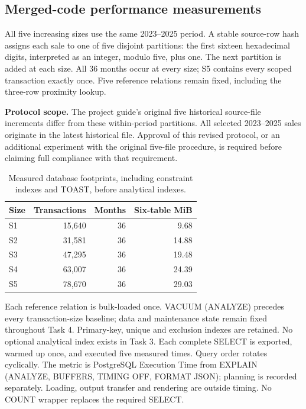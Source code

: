 \documentclass[11pt,a4paper]{article}
\begin{document}
\subsection{Merged-code performance measurements}
All five increasing sizes use the same 2023--2025 period. A stable source-row hash assigns each sale to one of five disjoint partitions: the first sixteen hexadecimal digits, interpreted as an integer, modulo five, plus one. The next partition is added at each size. All 36 months occur at every size; S5 contains every scoped transaction exactly once. Five reference relations remain fixed, including the three-row proximity lookup.

\textbf{Protocol scope.} The project guide's original five historical source-file increments differ from these within-period partitions. All selected 2023--2025 sales originate in the latest historical file. Approval of this revised protocol, or an additional experiment with the original five-file procedure, is required before claiming full compliance with that requirement.

\begin{table}[H]\centering\small
\begin{tabular}{lrrr}
\toprule
Size & Transactions & Months & Six-table MiB \\
\midrule
S1 & 15,640 & 36 & 9.68 \\
S2 & 31,581 & 36 & 14.88 \\
S3 & 47,295 & 36 & 19.48 \\
S4 & 63,007 & 36 & 24.39 \\
S5 & 78,670 & 36 & 29.03 \\
\bottomrule
\end{tabular}
\caption{Measured database footprints, including constraint indexes and TOAST, before analytical indexes.}
\end{table}

Each reference relation is bulk-loaded once. VACUUM (ANALYZE) precedes every transaction-size baseline; data and maintenance state remain fixed throughout Task 4. Primary-key, unique and exclusion indexes are retained. No optional analytical index exists in Task 3. Each complete SELECT is exported, warmed up once, and executed five measured times. Query order rotates cyclically. The metric is PostgreSQL Execution Time from EXPLAIN (ANALYZE, BUFFERS, TIMING OFF, FORMAT JSON); planning is recorded separately. Loading, output transfer and rendering are outside timing. No COUNT wrapper replaces the required SELECT.
\end{document}
